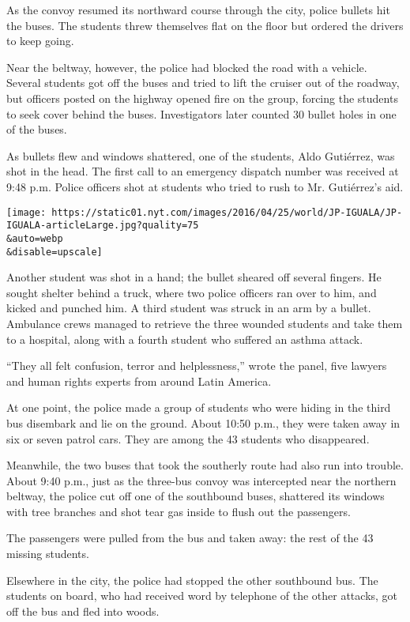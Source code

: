 As the convoy resumed its northward course through the city, police
bullets hit the buses. The students threw themselves flat on the floor
but ordered the drivers to keep going.

Near the beltway, however, the police had blocked the road with a
vehicle. Several students got off the buses and tried to lift the
cruiser out of the roadway, but officers posted on the highway opened
fire on the group, forcing the students to seek cover behind the buses.
Investigators later counted 30 bullet holes in one of the buses.

As bullets flew and windows shattered, one of the students, Aldo
Gutiérrez, was shot in the head. The first call to an emergency dispatch
number was received at 9:48 p.m. Police officers shot at students who
tried to rush to Mr. Gutiérrez's aid.

\texttt{[image: https://static01.nyt.com/images/2016/04/25/world/JP-IGUALA/JP-IGUALA-articleLarge.jpg?quality=75\\\&auto=webp\\\&disable=upscale]}

Another student was shot in a hand; the bullet sheared off several
fingers. He sought shelter behind a truck, where two police officers ran
over to him, and kicked and punched him. A third student was struck in
an arm by a bullet. Ambulance crews managed to retrieve the three
wounded students and take them to a hospital, along with a fourth
student who suffered an asthma attack.

``They all felt confusion, terror and helplessness,'' wrote the panel,
five lawyers and human rights experts from around Latin America.

At one point, the police made a group of students who were hiding in the
third bus disembark and lie on the ground. About 10:50 p.m., they were
taken away in six or seven patrol cars. They are among the 43 students
who disappeared.

Meanwhile, the two buses that took the southerly route had also run into
trouble. About 9:40 p.m., just as the three-bus convoy was intercepted
near the northern beltway, the police cut off one of the southbound
buses, shattered its windows with tree branches and shot tear gas inside
to flush out the passengers.

The passengers were pulled from the bus and taken away: the rest of the
43 missing students.

Elsewhere in the city, the police had stopped the other southbound bus.
The students on board, who had received word by telephone of the other
attacks, got off the bus and fled into woods.

